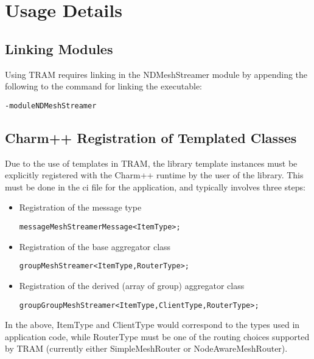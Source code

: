
\section{Usage Details}

\subsection{Linking Modules}

Using TRAM requires linking in the NDMeshStreamer module by appending the
following to the command for linking the executable:

\begin{alltt}
-module NDMeshStreamer
\end{alltt}

\subsection{Charm++ Registration of Templated Classes}

Due to the use of templates in TRAM, the library template instances must be
explicitly registered with the Charm++ runtime by the user of the library. This
must be done in the ci file for the application, and typically involves three
steps:

\begin{itemize}
\item{Registration of the message type}
\begin{alltt}
message MeshStreamerMessage<ItemType>;
\end{alltt}
\item{Registration of the base aggregator class}
\begin{alltt}
group MeshStreamer<ItemType, RouterType>;
\end{alltt}
\item{Registration of the derived (array of group) aggregator class}
\begin{alltt}
group GroupMeshStreamer<ItemType, ClientType, RouterType>;
\end{alltt}
\end{itemize}

In the above, ItemType and ClientType would correspond to the types used in
application code, while RouterType must be one of the routing choices supported
by TRAM (currently either SimpleMeshRouter or NodeAwareMeshRouter).

